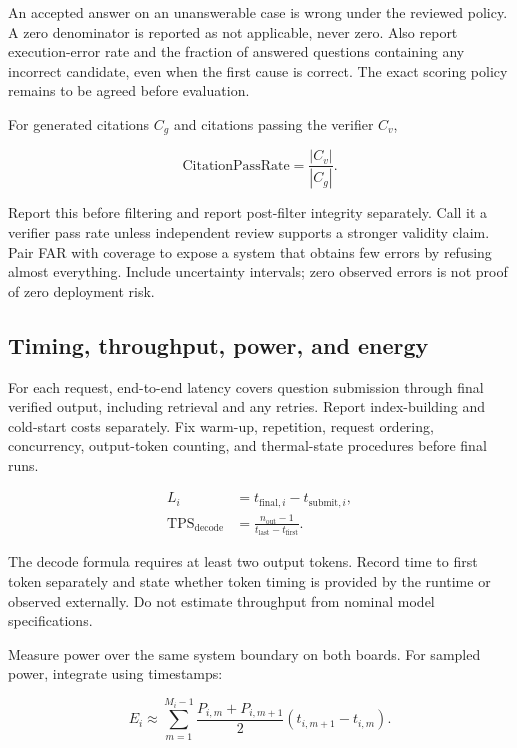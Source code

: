 \documentclass[conference]{IEEEtran}
\begin{document}
An accepted answer on an unanswerable case is wrong under
the reviewed policy. A zero denominator is reported as not
applicable, never zero. Also report execution-error rate and
the fraction of answered questions containing any incorrect
candidate, even when the first cause is correct. The exact
scoring policy remains to be agreed before evaluation.

For generated citations $C_g$ and citations passing
the verifier $C_v$,

\begin{equation}
\mathrm{CitationPassRate}=\frac{|C_v|}{|C_g|}.
\end{equation}

Report this before filtering and report post-filter integrity
separately. Call it a verifier pass rate unless independent
review supports a stronger validity claim. Pair FAR with
coverage to expose a system that obtains few errors by
refusing almost everything. Include uncertainty intervals;
zero observed errors is not proof of zero deployment risk.

\subsection{Timing, throughput, power, and energy}

For each request, end-to-end latency covers question submission
through final verified output, including retrieval and any
retries. Report index-building and cold-start costs separately.
Fix warm-up, repetition, request ordering, concurrency,
output-token counting, and thermal-state procedures
before final runs.

\begin{align}
L_i &= t_{\mathrm{final},i}-t_{\mathrm{submit},i},\\
\mathrm{TPS}_{\mathrm{decode}} &=
\frac{n_{\mathrm{out}}-1}
{t_{\mathrm{last}}-t_{\mathrm{first}}}.
\end{align}

The decode formula requires at least two output tokens.
Record time to first token separately and state whether
token timing is provided by the runtime or observed externally.
Do not estimate throughput from nominal model specifications.

Measure power over the same system boundary on both boards.
For sampled power, integrate using timestamps:

\begin{equation}
E_i\approx
\sum_{m=1}^{M_i-1}
\frac{P_{i,m}+P_{i,m+1}}{2}
\left(t_{i,m+1}-t_{i,m}\right).
\end{equation}
\end{document}

